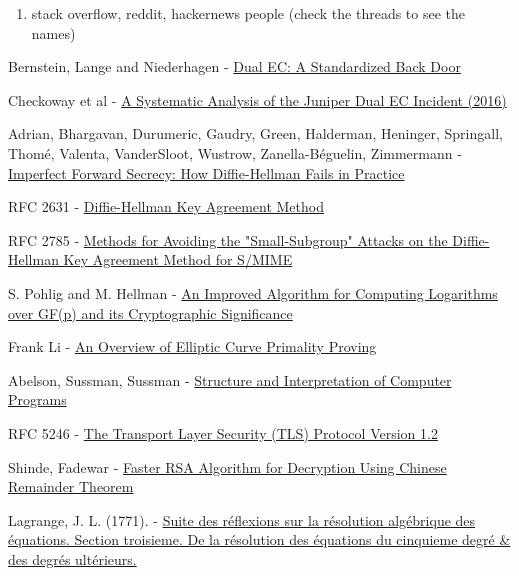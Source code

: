 \documentclass[a4paper,11pt,twocolumn]{article}
\begin{document}
\begin{enumerate}
    \item stack overflow, reddit, hackernews people (check the threads to see the names)
\end{enumerate}

\newpage

\begin{thebibliography}{1}

 Bernstein, Lange and Niederhagen - \href{https://eprint.iacr.org/2015/767.pdf}{Dual EC: A Standardized Back Door}

 Checkoway et al - \href{http://eprint.iacr.org/2016/376}{A Systematic Analysis of the Juniper Dual EC Incident (2016)}

 Adrian, Bhargavan, Durumeric, Gaudry, Green, Halderman, Heninger, Springall, Thomé, Valenta,  VanderSloot, Wustrow, Zanella-Béguelin, Zimmermann -  \href{https://weakdh.org/imperfect-forward-secrecy-ccs15.pdf}{Imperfect Forward Secrecy: How Diffie-Hellman Fails in Practice}

 RFC 2631 - \href{https://tools.ietf.org/html/rfc2631}{Diffie-Hellman Key Agreement Method}

 RFC 2785 - \href{https://tools.ietf.org/html/rfc2785}{Methods for Avoiding the "Small-Subgroup" Attacks on the Diffie-Hellman Key Agreement Method for S/MIME}

 S. Pohlig and M. Hellman - \href{http://www-ee.stanford.edu/~hellman/publications/28.pdf}{An Improved Algorithm for Computing Logarithms over GF(p) and its Cryptographic Significance}

 Frank Li - \href{http://theory.stanford.edu/~dfreeman/cs259c-f11/finalpapers/primalityproving.pdf}{An Overview of Elliptic Curve Primality Proving}

 Abelson, Sussman, Sussman -  \href{https://mitpress.mit.edu/sicp/chapter1/footnode.html#2413}{Structure and Interpretation of Computer Programs}

 RFC 5246 - \href{https://www.ietf.org/rfc/rfc5246.txt}{The Transport Layer Security (TLS) Protocol Version 1.2}

 Shinde, Fadewar -  \href{http://www.techscience.com/doi/10.3970/icces.2008.005.255.pdf}{Faster RSA Algorithm for Decryption Using Chinese Remainder Theorem}

 Lagrange, J. L. (1771). - \href{https://books.google.com/books?id=_-U_AAAAYAAJ&pg=PA138#v=onepage&q&f=false}{Suite des réflexions sur la résolution algébrique des équations. Section troisieme. De la résolution des équations du cinquieme degré & des degrés ultérieurs.}

\end{thebibliography}
\end{document}
